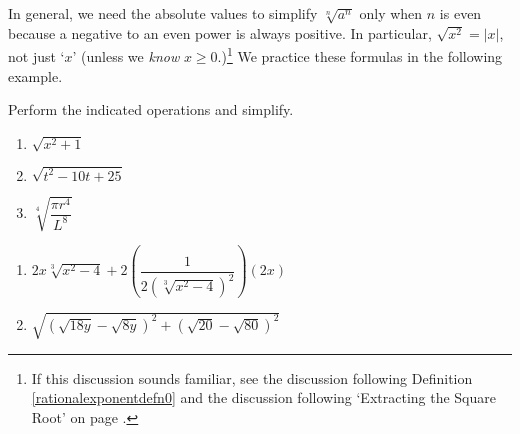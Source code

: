 \documentclass[10pt]{article}
\begin{document}
\medskip

In general, we need the absolute values to simplify $\sqrt[n]{a^{n}}$ only when $n$ is even because a negative to an even power is always positive.  In particular, $\sqrt{x^2} = |x|$, not just `$x$' (unless we \textit{know} $x \geq 0$.)\footnote{If this discussion sounds familiar, see the discussion following Definition \ref{rationalexponentdefn0} and the discussion following `Extracting the Square Root' on page \pageref{extractingthesquareroot}.}  We practice these formulas in the following example.

\begin{ex}\label{simplifyradexpressions}  Perform the indicated operations and simplify.

\begin{multicols}{3}

\begin{enumerate}

\item  $\sqrt{x^{2} + 1}$

\item  $\sqrt{t^2-10t+25}$


\item  $\sqrt[4]{\dfrac{\pi r^{4}}{L^{8}}}$


\setcounter{HW}{\value{enumi}}

\end{enumerate}

\end{multicols}

\begin{multicols}{2}

\begin{enumerate}
\setcounter{enumi}{\value{HW}}

\item $2x \sqrt[3]{x^2-4} + 2\left(\dfrac{1}{2(\sqrt[3]{x^2-4})^2}\right)  (2x)$ 

\item  $\sqrt{(\sqrt{18y} - \sqrt{8y})^2 + (\sqrt{20} - \sqrt{80})^2}$ 

\end{enumerate}

\end{multicols}


\end{ex}
\end{document}
